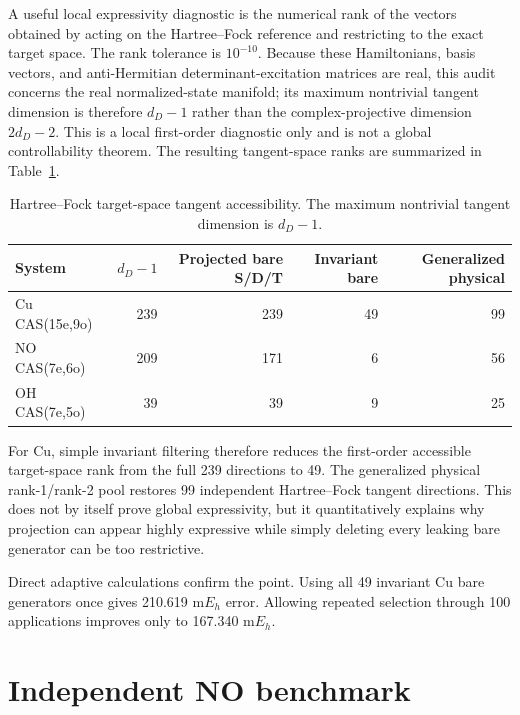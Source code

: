 \documentclass[
 aip,
 jcp,
 amsmath,amssymb,
 preprint
]{revtex4-2}
\begin{document}
A useful local expressivity diagnostic is the numerical rank of the vectors obtained by acting on the Hartree--Fock reference and restricting to the exact target space.
The rank tolerance is $10^{-10}$.
Because these Hamiltonians, basis vectors, and anti-Hermitian determinant-excitation matrices are real, this audit concerns the real normalized-state manifold; its maximum nontrivial tangent dimension is therefore $d_D-1$ rather than the complex-projective dimension $2d_D-2$.
This is a local first-order diagnostic only and is not a global controllability theorem.
The resulting tangent-space ranks are summarized in Table~\ref{tab:tangent}.

\begin{table}[htbp]
\centering
\small
\caption{Hartree--Fock target-space tangent accessibility. The maximum nontrivial tangent dimension is $d_D-1$.}
\label{tab:tangent}
\begin{tabular}{lrrrr}
\toprule
System & $d_D-1$ & Projected bare S/D/T & Invariant bare & Generalized physical\\
\midrule
Cu CAS(15e,9o) & 239 & 239 & 49 & 99\\
NO CAS(7e,6o) & 209 & 171 & 6 & 56\\
OH CAS(7e,5o) & 39 & 39 & 9 & 25\\
\bottomrule
\end{tabular}
\end{table}

For Cu, simple invariant filtering therefore reduces the first-order accessible target-space rank from the full 239 directions to 49.
The generalized physical rank-1/rank-2 pool restores 99 independent Hartree--Fock tangent directions.
This does not by itself prove global expressivity, but it quantitatively explains why projection can appear highly expressive while simply deleting every leaking bare generator can be too restrictive.

Direct adaptive calculations confirm the point.
Using all 49 invariant Cu bare generators once gives 210.619 m$E_h$ error.
Allowing repeated selection through 100 applications improves only to 167.340 m$E_h$.

\section{Independent NO benchmark}
\end{document}
